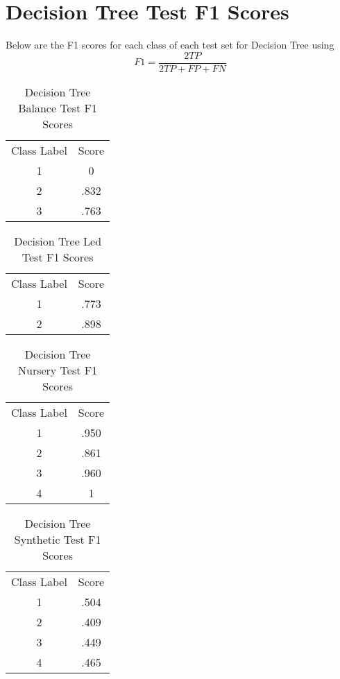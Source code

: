 \documentclass{article}
\begin{document}
\section*{Decision Tree Test F1 Scores}
Below are the F1 scores for each class of each test set for Decision Tree using $$F1 = \frac{2TP}{2TP + FP + FN}$$
\begin{table}[htbp]
\caption{Decision Tree Balance Test F1 Scores}
\begin{tabular}{ |c|c| }
 \hline
 Class Label & Score\\
 1 & 0\\
 2 & .832\\
 3 & .763\\
 \hline
\end{tabular}
\end{table}
\begin{table}[htbp]
\caption{Decision Tree Led Test F1 Scores}
\begin{tabular}{ |c|c| }
 \hline
 Class Label & Score\\
 1 & .773\\
 2 & .898\\
 \hline
\end{tabular}
\end{table}
\begin{table}[htbp]
\caption{Decision Tree Nursery Test F1 Scores}
\begin{tabular}{ |c|c| }
 \hline
 Class Label & Score\\
 1 & .950\\
 2 & .861\\
 3 & .960\\
 4 & 1\\
 \hline
\end{tabular}
\end{table}
\begin{table}[htbp]
\caption{Decision Tree Synthetic Test F1 Scores}
\begin{tabular}{ |c|c| }
 \hline
 Class Label & Score\\
 1 & .504\\
 2 & .409\\
 3 & .449\\
 4 & .465\\
 \hline
\end{tabular}
\end{table}
\end{document}
